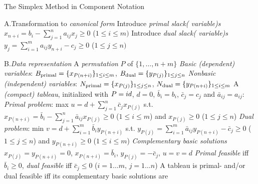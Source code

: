 \beginsection The Simplex Method in Component Notation

\item{A.}Transformation to \emph{canonical form}\smallskip
{}Introduce \emph{primal slack( variable)s} $x_{n+i}=b_i-\sum_{j=1}^n
a_{ij}x_j\geq 0$ ($1\leq i\leq m)$\smallskip
{}Introduce \emph{dual slack( variable)s} $y_{j}=\sum_{i=1}^m
a_{ij}y_{n+i}-c_j\geq 0$ ($1\leq j\leq n)$\smallskip

\item{B.}\emph{Data representation}\smallskip
{}A \emph{permutation} $P$ of $\{1,\ldots,n+m\}$\smallskip
{}\emph{Basic (dependent) variables}: ${\sl B}_{\rm primal}=\{
x_{P(n+i)}\}_{1\leq i\leq m}$, ${\sl B}_{\rm dual}=\{ y_{P(j)}\}_{1\leq j\leq
n}$\smallskip
{}\emph{Nonbasic (independent) variables}: ${\sl N}_{\rm primal}=\{
x_{P(j)}\}_{1\leq j\leq n}$, ${\sl N}_{\rm dual}=\{ y_{P(n+i)}\}_{1\leq i\leq
m}$\smallskip
{}A \emph{(compact) tableau}, initialized with $P={\sl id}$, $d=0$,
$\bar{b}_i=b_i$, $\bar{c}_j=c_j$ and $\bar{a}_{ij}=a_{ij}$:\smallskip
\iitem{}\vbox{\offinterlineskip
}\smallskip
{}\emph{Primal problem}: max $u=d+\sum_{j=1}^n\bar{c}_jx_{P(j)}$ s.t.
$x_{P(n+i)}=\bar{b}_i-\sum_{j=1}^n\bar{a}_{ij}x_{P(j)}\geq 0$ ($1\leq i\leq m$)
and $x_{P(j)}\geq 0$ ($1\leq j\leq n$)\smallskip
{}\emph{Dual problem}: min
$v=d+\sum_{i=1}^m\bar{b}_iy_{P(n+i)}$ s.t.
$y_{P(j)}=\sum_{i=1}^m\bar{a}_{ij}y_{P(n+i)}-\bar{c}_j\geq 0$ ($1\leq j\leq n$)
and $y_{P(n+i)}\geq 0$ ($1\leq i\leq m$)\smallskip
{}\emph{Complementary basic solutions} $x_{P(j)}=y_{P(n+i)}=0$,
$x_{P(n+i)}=\bar{b}_i$, $y_{P(j)}=-\bar{c}_j$, $u=v=d$
\smallskip
{}\emph{Primal feasible} iff $\bar{b}_i\geq 0$, \emph{dual feasible}
iff $\bar{c}_j\leq 0$ ($i=1\ldots m$,  $j=1\ldots n$)\smallskip
{}A tableau is primal- and/or dual feasible iff its complementary
basic solutions are\smallskip

